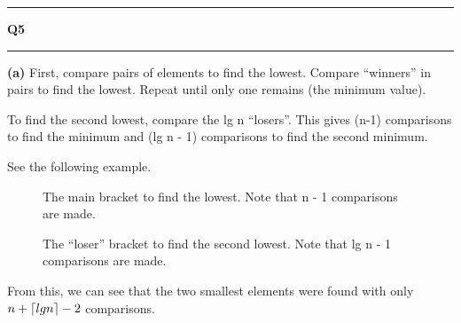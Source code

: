 \documentclass[11pt]{article}
\DeclarePairedDelimiter{\ceil}{\lceil}{\rceil}
\newcommand\question[2]{\vspace{.25in}\hrule\textbf{#1 #2}\vspace{.5em}\hrule\vspace{.10in}}
\renewcommand\part[1]{\vspace{.10in}\textbf{(#1)}}
\begin{document}
\question{Q5}{}
\part{a}
First, compare pairs of elements to find the lowest. Compare ``winners'' in pairs to find the lowest. Repeat until only one remains (the minimum value).

To find the second lowest, compare the lg n ``losers''. This gives (n-1) comparisons to find the minimum and (lg n - 1) comparisons to find the second minimum.

See the following example.

\begin{figure}[htbp!]
\centering
{}
\caption*{The main bracket to find the lowest. Note that n - 1 comparisons are made.}
\end{figure}

\begin{figure}[htbp!]
\centering
{}
\caption*{The ``loser'' bracket to find the second lowest. Note that lg n - 1 comparisons are made.}
\end{figure}
\newpage
From this, we can see that the two smallest elements were found with only $n + \ceil{lg n} - 2$ comparisons.
\end{document}
